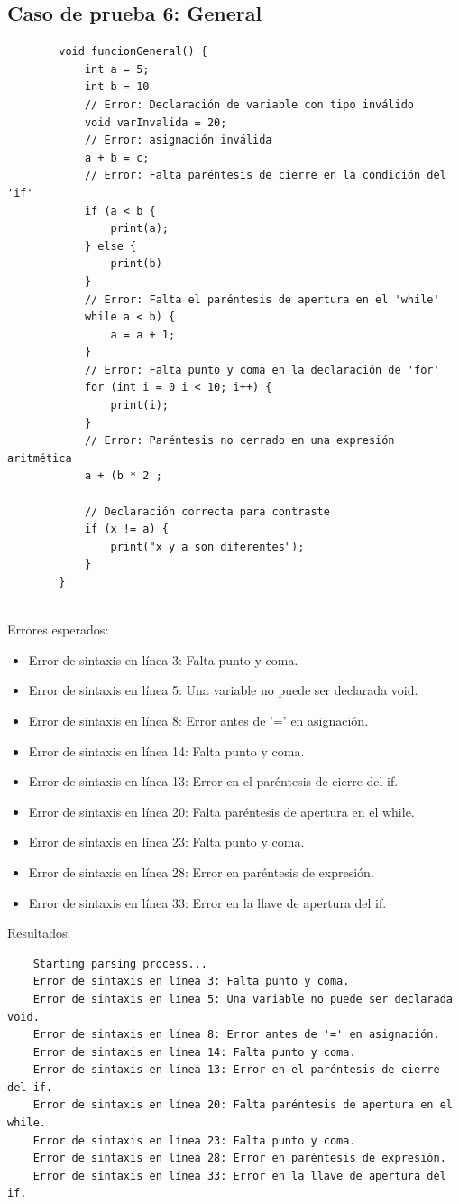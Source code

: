 \documentclass[a4paper,12pt]{article}
\begin{document}
\subsection*{Caso de prueba 6: General}
\begin{flushleft}
	\begin{verbatim}
		void funcionGeneral() {
			int a = 5;
			int b = 10
			// Error: Declaración de variable con tipo inválido
			void varInvalida = 20;
			// Error: asignación inválida
			a + b = c;
			// Error: Falta paréntesis de cierre en la condición del 'if'
			if (a < b {
				print(a);
			} else {
				print(b)
			}
			// Error: Falta el paréntesis de apertura en el 'while'
			while a < b) {
				a = a + 1;
			}
			// Error: Falta punto y coma en la declaración de 'for'
			for (int i = 0 i < 10; i++) {
				print(i);
			}
			// Error: Paréntesis no cerrado en una expresión aritmética 
			a + (b * 2 ;
			
			// Declaración correcta para contraste
			if (x != a) {
				print("x y a son diferentes");
			}
		}
		
	\end{verbatim}
	Errores esperados:
	\begin{itemize}
	\item	Error de sintaxis en línea 3: Falta punto y coma.
	\item	Error de sintaxis en línea 5: Una variable no puede ser declarada void.
	\item	Error de sintaxis en línea 8: Error antes de '=' en asignación.
	\item	Error de sintaxis en línea 14: Falta punto y coma.
	\item	Error de sintaxis en línea 13: Error en el paréntesis de cierre del if.
	\item	Error de sintaxis en línea 20: Falta paréntesis de apertura en el while.
	\item	Error de sintaxis en línea 23: Falta punto y coma.
	\item	Error de sintaxis en línea 28: Error en paréntesis de expresión.
	\item	Error de sintaxis en línea 33: Error en la llave de apertura del if.
	\end{itemize}
	Resultados:
	\begin{verbatim}
	Starting parsing process...
	Error de sintaxis en línea 3: Falta punto y coma.
	Error de sintaxis en línea 5: Una variable no puede ser declarada void.
	Error de sintaxis en línea 8: Error antes de '=' en asignación.
	Error de sintaxis en línea 14: Falta punto y coma.
	Error de sintaxis en línea 13: Error en el paréntesis de cierre del if.
	Error de sintaxis en línea 20: Falta paréntesis de apertura en el while.
	Error de sintaxis en línea 23: Falta punto y coma.
	Error de sintaxis en línea 28: Error en paréntesis de expresión.
	Error de sintaxis en línea 33: Error en la llave de apertura del if.
	\end{verbatim}
\end{flushleft}
\end{document}
